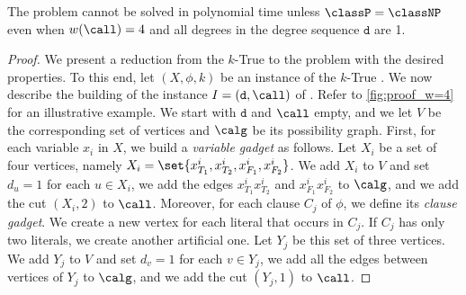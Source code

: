 \begin{theorem}
    The \GRC{} problem cannot be solved in polynomial time unless $\classP = \classNP$ even when $w(\call) = 4$ and all degrees in the degree sequence $\texttt{d}$ are 1.%
\end{theorem}
\begin{proof}


    We present a reduction from the $k$-True \rXthreeSAT{} to the \GRC{} problem with the desired properties.
    To this end, let $(X, \phi, k)$ be an instance of the $k$-True \rXthreeSAT{}.
    We now describe the building of the instance $I = (\texttt{d}, \call)$ of \GRC{}.
    Refer to \cref{fig:proof_w=4} for an illustrative example.
    We start with $\texttt{d}$ and $\call$ empty, and we let $V$ be the corresponding set of vertices and $\calg$ be its possibility graph.
    First, for each variable $x_i$ in $X$, we build a \textit{variable gadget} as follows.
    Let $X_i$ be a set of four vertices, namely $X_i = \set{ x^i_{T_1}, x^i_{T_2}, x^i_{F_1}, x^i_{F_2}}$.
    We add $X_i$ to $V$ and set $d_u = 1$ for each $u \in X_i$, we add the edges $x^i_{T_1} x^i_{T_2}$ and $x^i_{F_1} x^i_{F_2}$ to $\calg$, and we add the cut $( X_i, 2)$ to $\call$.
    Moreover, for each clause $C_j$ of $\phi$, we define its \textit{clause gadget}.
    We create a new vertex for each literal that occurs in $C_j$. If $C_j$ has only two literals, we create another artificial one. Let $Y_j$ be this set of three vertices.
    We add $Y_j$ to $V$ and set $d_v = 1$ for each $v \in Y_j$, we add all the edges between vertices of $Y_j$ to $\calg$, and we add the cut $(Y_j, 1)$ to $\call$.


\end{proof}

